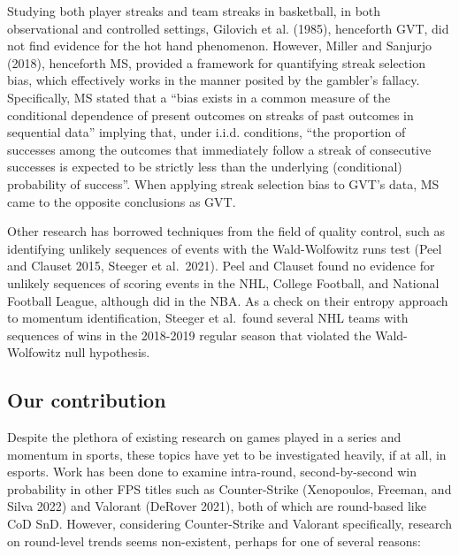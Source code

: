 \documentclass{article}
\begin{document}
Studying both player streaks and team streaks in basketball, in both
observational and controlled settings, Gilovich et al. (1985),
henceforth GVT, did not find evidence for the hot hand phenomenon.
However, Miller and Sanjurjo (2018), henceforth MS, provided a framework
for quantifying streak selection bias, which effectively works in the
manner posited by the gambler's fallacy. Specifically, MS stated that a
``bias exists in a common measure of the conditional dependence of
present outcomes on streaks of past outcomes in sequential data''
implying that, under i.i.d. conditions, ``the proportion of successes
among the outcomes that immediately follow a streak of consecutive
successes is expected to be strictly less than the underlying
(conditional) probability of success''. When applying streak selection
bias to GVT's data, MS came to the opposite conclusions as GVT.

Other research has borrowed techniques from the field of quality
control, such as identifying unlikely sequences of events with the
Wald-Wolfowitz runs test (Peel and Clauset 2015, Steeger et al.~2021).
Peel and Clauset found no evidence for unlikely sequences of scoring
events in the NHL, College Football, and National Football League,
although did in the NBA. As a check on their entropy approach to
momentum identification, Steeger et al.~found several NHL teams with
sequences of wins in the 2018-2019 regular season that violated the
Wald-Wolfowitz null hypothesis.

\hypertarget{our-contribution}{%
\subsection{Our contribution}\label{our-contribution}}

Despite the plethora of existing research on games played in a series
and momentum in sports, these topics have yet to be investigated
heavily, if at all, in esports. Work has been done to examine
intra-round, second-by-second win probability in other FPS titles such
as Counter-Strike (Xenopoulos, Freeman, and Silva 2022) and Valorant
(DeRover 2021), both of which are round-based like CoD SnD. However,
considering Counter-Strike and Valorant specifically, research on
round-level trends seems non-existent, perhaps for one of several
reasons:
\end{document}
